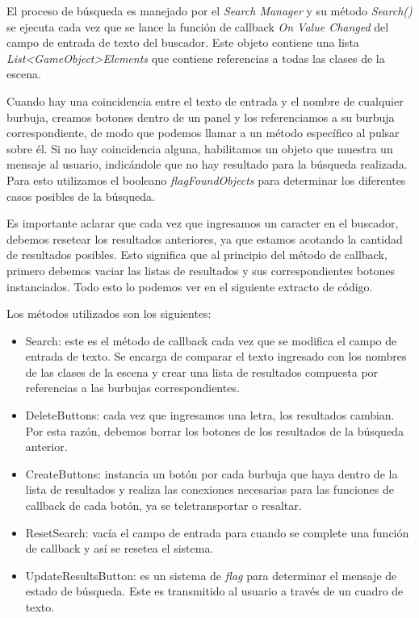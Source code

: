 El proceso de búsqueda es manejado por el \textit{Search Manager} y su método \textit{Search()} se ejecuta cada vez que se lance la función de callback \textit{On Value Changed} del campo de entrada de texto del buscador. Este objeto contiene una lista \textit{List<GameObject>Elements} que contiene referencias a todas las clases de la escena.

Cuando hay una coincidencia entre el texto de entrada y el nombre de cualquier burbuja, creamos botones dentro de un panel y los referenciamos a su burbuja correspondiente, de modo que podemos llamar a un método específico al pulsar sobre él. Si no hay coincidencia alguna, habilitamos un objeto que muestra un mensaje al usuario, indicándole que no hay resultado para la búsqueda realizada. Para esto utilizamos el booleano \textit{flagFoundObjects} para determinar los diferentes casos posibles de la búsqueda.

Es importante aclarar que cada vez que ingresamos un caracter en el buscador, debemos resetear los resultados anteriores, ya que estamos acotando la cantidad de resultados posibles. Esto significa que al principio del método de callback, primero debemos vaciar las listas de resultados y sus correspondientes botones instanciados. Todo esto lo podemos ver en el siguiente extracto de código.



Los métodos utilizados son los siguientes:
\begin{itemize}
   \item Search: este es el método de callback cada vez que se modifica el campo de entrada de texto. Se encarga de comparar el texto ingresado con los nombres de las clases de la escena y crear una lista de resultados compuesta por referencias a las burbujas correspondientes.
   \item DeleteButtons: cada vez que ingresamos una letra, los resultados cambian. Por esta razón, debemos borrar los botones de los resultados de la búsqueda anterior.
   \item CreateButtons: instancia un botón por cada burbuja que haya dentro de la lista de resultados y realiza las conexiones necesarias para las funciones de callback de cada botón, ya se teletransportar o resaltar.
   \item ResetSearch: vacía el campo de entrada para cuando se complete una función de callback y así se resetea el sistema.
   \item UpdateResultsButton: es un sistema de \textit{flag} para determinar el mensaje de estado de búsqueda. Este es transmitido al usuario a través de un cuadro de texto.
\end{itemize}


